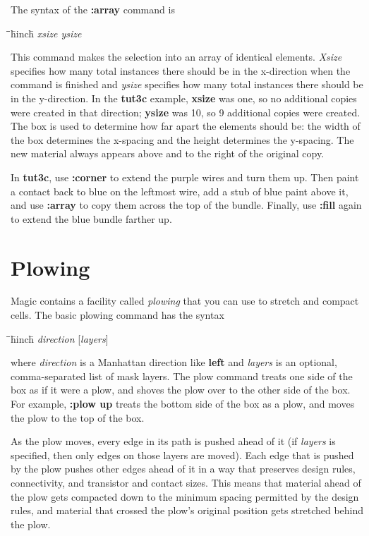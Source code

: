 \documentclass[letterpaper,twoside,12pt]{article}
\def\hinch{\hspace*{0.5in}}
\def\starti{\begin{center}\begin{tabbing}\hinch\=\hinch\=\hinch\=hinch\hinch\=\kill}
\def\endi{\end{tabbing}\end{center}}
\def\ii{\>\>\>}
\begin{document}
The syntax of the {\bfseries :array} command is

\starti
   \ii {\bfseries :array} {\itshape xsize ysize}
\endi

This command makes the selection into an array of identical elements.
{\itshape Xsize} specifies how many total instances there should be
in the x-direction when the command is finished and {\itshape ysize}
specifies how many total instances there should be in the
y-direction.  In the {\bfseries tut3c} example, {\bfseries xsize} was one,
so no additional copies were created in that direction;  {\bfseries ysize}
was 10, so 9 additional copies were created.  The box is used to
determine how far apart the elements should be:  the width of the
box determines the x-spacing and the height determines the y-spacing.
The new material always appears above and to the right of the original
copy.

In {\bfseries tut3c}, use {\bfseries :corner} to extend the purple wires and
turn them up.  Then paint a contact back to blue on the leftmost
wire, add a stub of blue paint above it, and use {\bfseries :array} to
copy them across the top of the bundle.  Finally,
use {\bfseries :fill} again to extend the blue bundle farther up.

\section{Plowing}

Magic contains a facility called {\itshape plowing} that you can
use to stretch and compact cells.  The basic plowing command
has the syntax

\starti
   \ii {\bfseries :plow} {\itshape  direction }[{\itshape layers}]
\endi

where {\itshape direction} is a Manhattan direction like {\bfseries left} and
{\itshape layers} is an optional, comma-separated list of mask layers.
The plow command
treats one side of the box as if it were a plow, and shoves
the plow over to the other side of the box.  For example,
{\bfseries :plow up} treats the bottom side of the box as a plow,
and moves the plow to the top of the box.

As the plow moves,
every edge in its path is pushed ahead of it (if {\itshape layers}
is specified, then only edges on those layers are moved).
Each edge that is pushed by the plow pushes other edges ahead
of it in a way that preserves design rules, connectivity,
and transistor and contact sizes.  This means that material
ahead of the plow gets compacted down to the minimum spacing
permitted by the design rules, and material that crossed the
plow's original position gets stretched behind the plow.
\end{document}
